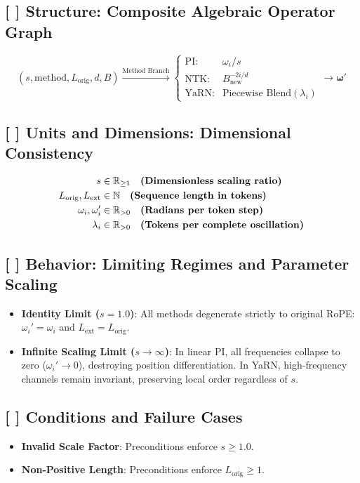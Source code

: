 \documentclass[11pt,a4paper]{article}
\theoremstyle{definition}
\begin{document}
\subsection{[ ] Structure: Composite Algebraic Operator Graph}
{\boldmath
\begin{equation}
(s, \text{method}, L_{\text{orig}}, d, B) \xrightarrow{\text{Method Branch}} \begin{cases} \text{PI}: & \omega_i / s \\ \text{NTK}: & B_{\text{new}}^{-2i/d} \\ \text{YaRN}: & \text{Piecewise Blend}(\lambda_i) \end{cases} \xrightarrow{} \boldsymbol{\omega}'
\end{equation}
}

\subsection{[ ] Units and Dimensions: Dimensional Consistency}
{\boldmath
\begin{align}
s &\in \mathbb{R}_{\ge 1} \quad \text{\textbf{(Dimensionless scaling ratio)}} \\
L_{\text{orig}}, L_{\text{ext}} &\in \mathbb{N} \quad \text{\textbf{(Sequence length in tokens)}} \\
\omega_i, \omega_i' &\in \mathbb{R}_{> 0} \quad \text{\textbf{(Radians per token step)}} \\
\lambda_i &\in \mathbb{R}_{> 0} \quad \text{\textbf{(Tokens per complete oscillation)}}
\end{align}
}

\subsection{[ ] Behavior: Limiting Regimes and Parameter Scaling}
\begin{itemize}
    \item \textbf{Identity Limit ($s = 1.0$)}: All methods degenerate strictly to original RoPE: $\omega_i' = \omega_i$ and $L_{\text{ext}} = L_{\text{orig}}$.
    \item \textbf{Infinite Scaling Limit ($s \to \infty$)}: In linear PI, all frequencies collapse to zero ($\omega_i' \to 0$), destroying position differentiation. In YaRN, high-frequency channels remain invariant, preserving local order regardless of $s$.
\end{itemize}

\subsection{[ ] Conditions and Failure Cases}
\begin{itemize}
    \item \textbf{Invalid Scale Factor}: Preconditions enforce $s \ge 1.0$.
    \item \textbf{Non-Positive Length}: Preconditions enforce $L_{\text{orig}} \ge 1$.
\end{itemize}
\end{document}
